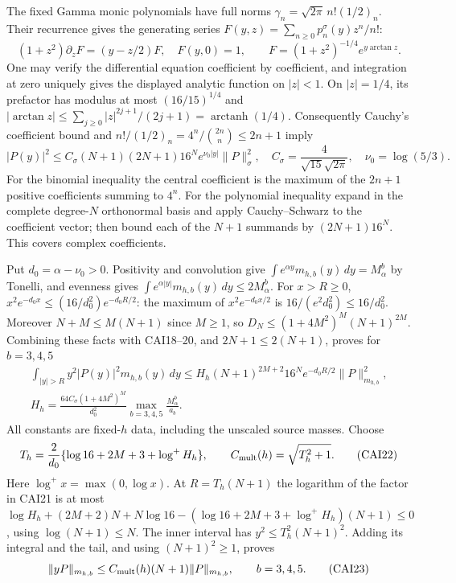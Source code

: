 \documentclass[11pt,a4paper]{article}
\begin{document}
The fixed Gamma monic polynomials have full norms
$\gamma_n=\sqrt{2\pi}\,n!(1/2)_n$. Their recurrence gives the
generating series $F(y,z)=\sum_{n\ge0}p_n^\sigma(y)z^n/n!$:
\[
 (1+z^2)\partial_zF=(y-z/2)F,\quad F(y,0)=1,\qquad
 F=(1+z^2)^{-1/4}e^{y\arctan z}.\tag{CAI19}
\]
One may verify the differential equation coefficient by coefficient,
and integration at zero uniquely gives the displayed analytic function
on $|z|<1$. On $|z|=1/4$, its prefactor has modulus at most
$(16/15)^{1/4}$ and
$|\arctan z|\le\sum_{j\ge0}|z|^{2j+1}/(2j+1)=\operatorname{arctanh}(1/4)$.
Consequently Cauchy's coefficient bound and
$n!/(1/2)_n=4^n/\binom{2n}{n}\le2n+1$ imply
\[
 |P(y)|^2\le C_\sigma(N+1)(2N+1)16^N e^{\nu_0|y|}\|P\|_\sigma^2,
 \quad C_\sigma=\frac4{\sqrt{15}\sqrt{2\pi}},\quad
 \nu_0=\log(5/3).\tag{CAI20}
\]
For the binomial inequality the central coefficient is the maximum of
the $2n+1$ positive coefficients summing to $4^n$. For the polynomial
inequality expand in the complete degree-$N$ orthonormal basis and
apply Cauchy--Schwarz to the coefficient vector; then bound each of
the $N+1$ summands by $(2N+1)16^N$. This covers complex coefficients.

Put $d_0=\alpha-\nu_0>0$. Positivity and convolution give
$\int e^{\alpha y}m_{h,b}(y)\,dy=M_\alpha^b$ by Tonelli, and evenness
gives $\int e^{\alpha|y|}m_{h,b}(y)\,dy\le2M_\alpha^b$.
For $x>R\ge0$,
$x^2e^{-d_0x}\le(16/d_0^2)e^{-d_0R/2}$: the maximum of
$x^2e^{-d_0x/2}$ is $16/(e^2d_0^2)\le16/d_0^2$.
Moreover $N+M\le M(N+1)$ since $M\ge1$, so
$D_N\le(1+4M^2)^M(N+1)^{2M}$. Combining these facts with CAI18--20,
and $2N+1\le2(N+1)$, proves for $b=3,4,5$
\[
 \begin{gathered}
 \int_{|y|>R}y^2|P(y)|^2m_{h,b}(y)\,dy
 \le H_h(N+1)^{2M+2}16^Ne^{-d_0R/2}\|P\|_{m_{h,b}}^2,
 \\ H_h=\frac{64C_\sigma(1+4M^2)^M}{d_0^2}
                          \max_{b=3,4,5}\frac{M_\alpha^b}{a_b}.
 \end{gathered}\tag{CAI21}
\]
All constants are fixed-$h$ data, including the unscaled source masses.
Choose
\[
 T_h=\frac2{d_0}\{\log16+2M+3+\log^+H_h\},\qquad
 C_{\rm mult}(h)=\sqrt{T_h^2+1}.\tag{CAI22}
\]
Here $\log^+x=\max(0,\log x)$. At $R=T_h(N+1)$ the logarithm of the
factor in CAI21 is at most
$\log H_h+(2M+2)N+N\log16-
(\log16+2M+3+\log^+H_h)(N+1)\le0$, using
$\log(N+1)\le N$. The inner interval has $y^2\le T_h^2(N+1)^2$.
Adding its integral and the tail, and using $(N+1)^2\ge1$, proves
\[
 \|yP\|_{m_{h,b}}\le C_{\rm mult}(h)(N+1)\|P\|_{m_{h,b}},
                         \qquad b=3,4,5.\tag{CAI23}
\]
\end{document}
